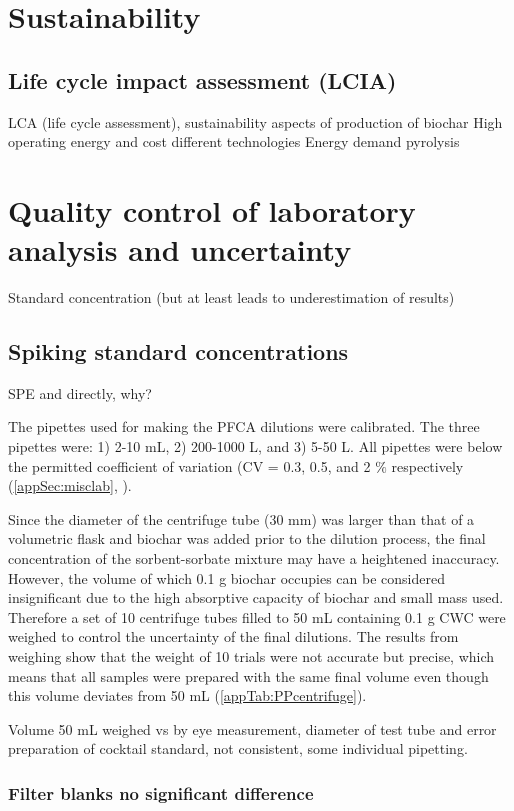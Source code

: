 \section{Sustainability}
\subsection{Life cycle impact assessment (LCIA)}
LCA (life cycle assessment), sustainability aspects of production of biochar
High operating energy and cost different technologies \citep{Alhashimi2017}
Energy demand pyrolysis 

\section{Quality control of laboratory analysis and uncertainty}
Standard concentration (but at least leads to underestimation of results)
\subsection{Spiking standard concentrations}
SPE and directly, why?

The pipettes used for making the PFCA dilutions were calibrated. The three pipettes were: 1) 2-10 mL, 2) 200-1000 \textmu L, and 3) 5-50 \textmu L. All pipettes were below the permitted coefficient of variation (CV = 0.3, 0.5, and 2 $\%$ respectively (\cref{appSec:misclab}, ).

Since the diameter of the centrifuge tube (30 mm) was larger than that of a volumetric flask and biochar was added prior to the dilution process, the final concentration of the sorbent-sorbate mixture may have a heightened inaccuracy. However, the volume of which 0.1 g biochar occupies can be considered insignificant due to the high absorptive capacity of biochar and small mass used. Therefore a set of 10 centrifuge tubes filled to 50 mL containing 0.1 g CWC were weighed to control the uncertainty of the final dilutions. The results from weighing show that the weight of 10 trials were not accurate but precise, which means that all samples were prepared with the same final volume even though this volume deviates from 50 mL (\cref{appTab:PPcentrifuge}). 

Volume 50 mL weighed vs by eye measurement, diameter of test tube and error
preparation of cocktail standard, not consistent, some individual pipetting. 

\subsubsection{Filter blanks no significant difference}

